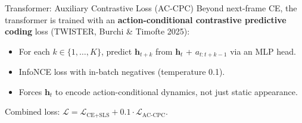 \documentclass[aspectratio=169]{beamer}
\begin{document}
\begin{frame}{Transformer: Auxiliary Contrastive Loss (AC-CPC)}
  \vspace{0.3em}
  Beyond next-frame CE, the transformer is trained with an \textbf{action-conditional contrastive predictive coding} loss (TWISTER, Burchi \& Timofte 2025):

  \vspace{0.5em}
  \begin{itemize}
    \item For each $k\in\{1,\ldots,K\}$, predict $\mathbf{h}_{t+k}$ from $\mathbf{h}_t$ + $a_{t:t+k-1}$ via an MLP head.
    \item InfoNCE loss with in-batch negatives (temperature 0.1).
    \item Forces $\mathbf{h}_t$ to encode action-conditional dynamics, not just static appearance.
  \end{itemize}

  \vspace{0.5em}
  Combined loss: $\mathcal{L} = \mathcal{L}_{\text{CE+SLS}} + 0.1 \cdot \mathcal{L}_{\text{AC-CPC}}$.
\end{frame}
\end{document}
